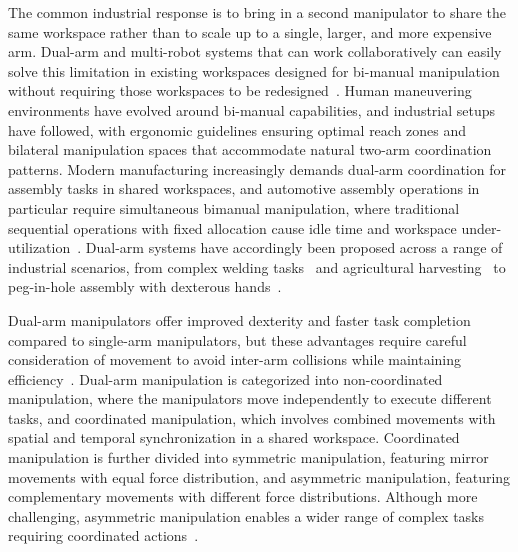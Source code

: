The common industrial response is to bring in a second manipulator to share the same workspace rather than to scale up to a single, larger, and more expensive arm. Dual-arm and multi-robot systems that can work collaboratively can easily solve this limitation in existing workspaces designed for bi-manual manipulation without requiring those workspaces to be redesigned~\citep{smith2012dual,makris2017dual}. Human maneuvering environments have evolved around bi-manual capabilities, and industrial setups have followed, with ergonomic guidelines ensuring optimal reach zones and bilateral manipulation spaces that accommodate natural two-arm coordination patterns. Modern manufacturing increasingly demands dual-arm coordination for assembly tasks in shared workspaces, and automotive assembly operations in particular require simultaneous bimanual manipulation, where traditional sequential operations with fixed allocation cause idle time and workspace under-utilization~\citep{qin2024online,marvel2018multi,pedersen2016robot}. Dual-arm systems have accordingly been proposed across a range of industrial scenarios, from complex welding tasks~\citep{gan2019multi} and agricultural harvesting~\citep{sepulveda2020robotic} to peg-in-hole assembly with dexterous hands~\citep{lee2022peg}.

Dual-arm manipulators offer improved dexterity and faster task completion compared to single-arm manipulators, but these advantages require careful consideration of movement to avoid inter-arm collisions while maintaining efficiency~\citep{smith2012dual}. Dual-arm manipulation is categorized into non-coordinated manipulation, where the manipulators move independently to execute different tasks, and coordinated manipulation, which involves combined movements with spatial and temporal synchronization in a shared workspace. Coordinated manipulation is further divided into symmetric manipulation, featuring mirror movements with equal force distribution, and asymmetric manipulation, featuring complementary movements with different force distributions. Although more challenging, asymmetric manipulation enables a wider range of complex tasks requiring coordinated actions~\citep{makris2021cooperative}.

